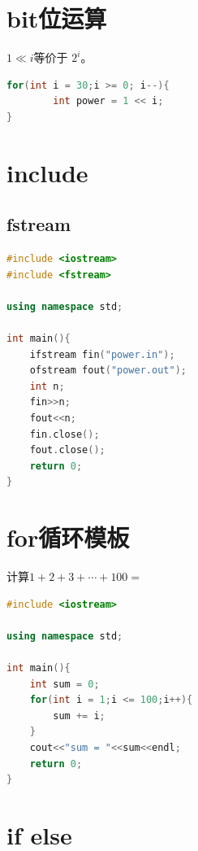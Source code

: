 \documentclass[12pt,twiside,a4paper]{ctexbook}
\numberwithin{chapter}{part}
\begin{document}
\section{bit位运算}
$1\ll i$等价于 $2^i$。
\begin{lstlisting}[language=C++]
for(int i = 30;i >= 0; i--){
		int power = 1 << i;
}
\end{lstlisting}
\section{include}
\subsection{fstream}
\begin{lstlisting}[language=C++]
#include <iostream>
#include <fstream>

using namespace std;

int main(){
	ifstream fin("power.in");
	ofstream fout("power.out");
	int n;
	fin>>n;
    fout<<n;
	fin.close();
	fout.close();
	return 0;
}
\end{lstlisting}
\section{for循环模板}
计算$1+2+3+\cdots+100 = $
\begin{lstlisting}[language=C++]
#include <iostream>

using namespace std;

int main(){
	int sum = 0;
	for(int i = 1;i <= 100;i++){
		sum += i;
	}
	cout<<"sum = "<<sum<<endl;
	return 0;
}
\end{lstlisting}

\section{if else}
\end{document}

